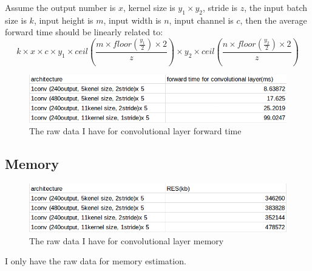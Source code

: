 \documentclass[10pt,twocolumn,letterpaper]{article}
\begin{document}
Assume the output number is $x$, kernel size is $y_1\times y_2$, stride is $z$, the input batch size is $k$, input height is $m$, input width is $n$, input channel is $c$, then the average forward time should be linearly related to:
\[k\times x\times c\times y_1\times ceil(\frac{m\times floor(\frac{y_1}{2})\times 2}{z})\times y_2\times ceil(\frac{n\times floor(\frac{y_2}{2})\times 2}{z}) \]
\begin{figure}[h]
	\begin{center}
		
		\includegraphics[width=1\linewidth]{mine2.png}
	\end{center}
	\caption{The raw data I have for convolutional layer forward time}
	\label{fig:long3}
	\label{fig:onecol3}
\end{figure}


\subsection{Memory}
\begin{figure}[h]
	\begin{center}
		
		\includegraphics[width=1\linewidth]{mine3.png}
	\end{center}
	\caption{The raw data I have for convolutional layer memory}
	\label{fig:long4}
	\label{fig:onecol4}
\end{figure}
I only have the raw data for memory estimation.


\end{document}
